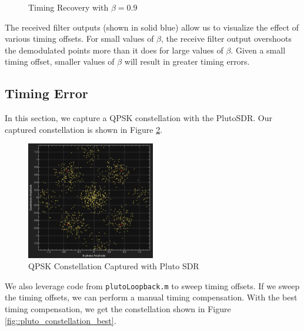 \documentclass{article}
\begin{document}
\begin{figure}[H]
	\centerline{}
	\caption{Timing Recovery with $\beta=0.9$}
	\label{fig::timing_recovery_beta_0_9}
\end{figure}

\noindent The received filter outputs (shown in solid blue) allow us to visualize the effect of various timing offsets. For small values of $\beta$, the receive filter output overshoots the demodulated points more than it does for large values of $\beta$. Given a small timing offset, smaller values of $\beta$ will result in greater timing errors.

\subsection{Timing Error}

In this section, we capture a QPSK constellation with the PlutoSDR. Our captured constellation is shown in Figure \ref{fig::pluto_constellation_raw}.

\begin{figure}[H]
	\centerline{\includegraphics[width=0.5\textwidth]{pluto_constellation_raw.png}}
	\caption{QPSK Constellation Captured with Pluto SDR}
	\label{fig::pluto_constellation_raw}
\end{figure}

\noindent We also leverage code from \texttt{plutoLoopback.m} to sweep timing offsets. If we sweep the timing offsets, we can perform a manual timing compensation. With the best timing compensation, we get the constellation shown in Figure \ref{fig::pluto_constellation_best}.
\end{document}
